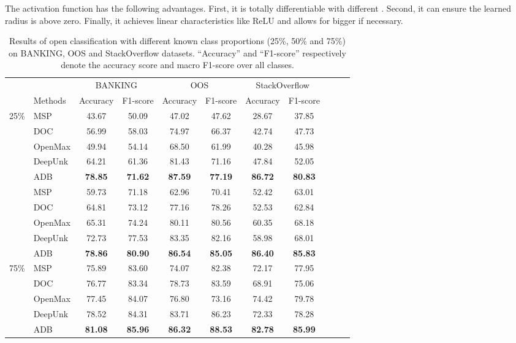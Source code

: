 \documentclass[letterpaper]{article} \usepackage{aaai21}  \usepackage{times}  \usepackage{helvet} \usepackage{courier}  \usepackage[hyphens]{url}  \usepackage{graphicx} \urlstyle{rm} \def\UrlFont{\rm}  \usepackage{natbib}  \usepackage{caption} \frenchspacing  \setlength{\pdfpagewidth}{8.5in}  \setlength{\pdfpageheight}{11in}  \usepackage{amsmath}
\begin{document}
	
	The  activation function has the following advantages. First, it is totally differentiable with different . Second, it can ensure the learned radius  is above zero. Finally, it achieves linear characteristics like ReLU  and allows for bigger  if necessary.
	\begin{table*}[!t]\small
		\centering
		\begin{tabular}{@{\extracolsep{15pt}}clccccccccc}
			\toprule
			\centering
			&  & \multicolumn{2}{c}{BANKING} & \multicolumn{2}{c}{OOS} & \multicolumn{2}{c}{StackOverflow} \\
			
			\addlinespace[0.1cm]  \cline{3-4} \cline{5-6} \cline{7-8}  \addlinespace[0.1cm]
			& Methods &  Accuracy & F1-score   & Accuracy & F1-score & Accuracy & F1-score\\
			\midrule
			\multirow{6}{*}[1ex]{25\%}
			& MSP  & 43.67 & 50.09  & 47.02 & 47.62   & 28.67 & 37.85\\
			& DOC  & 56.99 & 58.03  & 74.97 & 66.37  & 42.74 & 47.73\\
			& OpenMax  & 49.94 & 54.14  & 68.50 & 61.99  & 40.28 & 45.98\\
			& DeepUnk  & 64.21 & 61.36  & 81.43 & 71.16  & 47.84 & 52.05 \\									
			& ADB   & \textbf{78.85} & \textbf{71.62}  & \textbf{87.59} & \textbf{77.19}   & \textbf{86.72} & \textbf{80.83}\\
			\midrule
			\midrule
			\multirow{6}{*}[1ex]{50\%}
			& MSP & 59.73 & 71.18  & 62.96 & 70.41  & 52.42 & 63.01\\
			& DOC  & 64.81 & 73.12  & 77.16 & 78.26    & 52.53 & 62.84 \\
			& OpenMax  & 65.31 & 74.24  & 80.11 & 80.56  & 60.35 & 68.18\\
			& DeepUnk  & 72.73 & 77.53  & 83.35 & 82.16  & 58.98 & 68.01 \\
			& ADB 	&\textbf{78.86}	&\textbf{80.90}		&\textbf{86.54}	&\textbf{85.05}	&\textbf{86.40}	&\textbf{85.83}\\
			\midrule
			\midrule
			\multirow{6}{*}[1ex]{ 75\%}
			& MSP  & 75.89 & 83.60  & 74.07 & 82.38   & 72.17& 77.95\\
			& DOC  & 76.77 & 83.34  & 78.73 & 83.59 & 68.91 & 75.06\\
			& OpenMax  & 77.45 & 84.07  & 76.80 & 73.16   & 74.42 & 79.78\\
			& DeepUnk  & 78.52 & 84.31  & 83.71 & 86.23  & 72.33 & 78.28\\
			& ADB 	&\textbf{81.08}	&\textbf{85.96}		&\textbf{86.32}	&\textbf{88.53}	&\textbf{82.78}	&\textbf{85.99}\\
			\bottomrule
		\end{tabular}
		\caption{ \label{results-main-1}  
			Results of open classification with different known class proportions (25\%, 50\% and 75\%) on BANKING, OOS and StackOverflow datasets. “Accuracy” and “F1-score” respectively denote the
			accuracy score and macro F1-score over all classes.
		}
	\end{table*}
\end{document}

